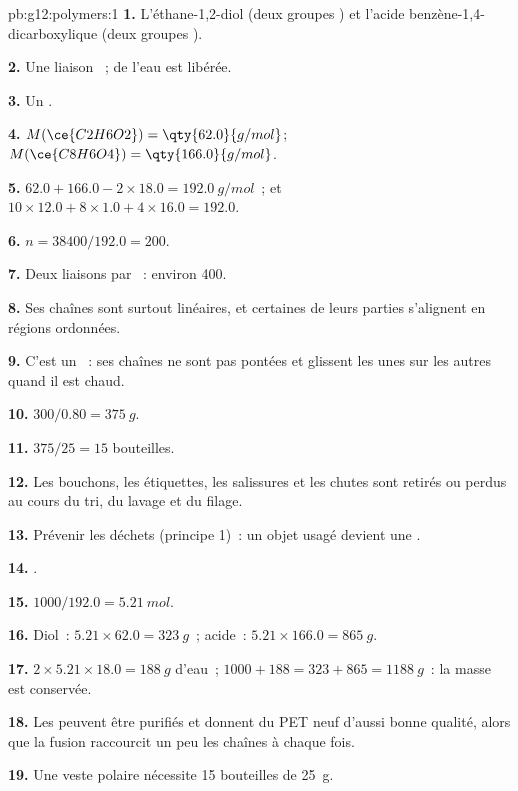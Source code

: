 \begin{solution}{pb:g12:polymers:1}
\textbf{1.} L'éthane-1,2-diol (deux groupes ) et l'acide
benzène-1,4-dicarboxylique (deux groupes ).

\textbf{2.} Une liaison ~; de l'eau est libérée.

\textbf{3.} Un .

\textbf{4.} $M(\ce{C2H6O2}) = \qty{62.0}{g/mol}$; $M(\ce{C8H6O4}) =
\qty{166.0}{g/mol}$.

\textbf{5.} $62.0 + 166.0 - 2 \times 18.0 = \qty{192.0}{g/mol}$~; et
$10 \times 12.0 + 8 \times 1.0 + 4 \times 16.0 = 192.0$.

\textbf{6.} $n = 38400/192.0 = 200$.

\textbf{7.} Deux liaisons  par ~: environ 400.

\textbf{8.} Ses chaînes sont surtout linéaires, et certaines de leurs
parties s'alignent en régions ordonnées.

\textbf{9.} C'est un ~: ses chaînes ne sont pas pontées
et glissent les unes sur les autres quand il est chaud.

\textbf{10.} $300/0.80 = \qty{375}{g}$.

\textbf{11.} $375/25 = 15$ bouteilles.

\textbf{12.} Les bouchons, les étiquettes, les salissures et les chutes
sont retirés ou perdus au cours du tri, du lavage et du filage.

\textbf{13.} Prévenir les déchets (principe 1)~: un objet usagé devient
une .

\textbf{14.} .

\textbf{15.} $1000/192.0 = \qty{5.21}{mol}$.

\textbf{16.} Diol~: $5.21 \times 62.0 = \qty{323}{g}$~; acide~:
$5.21 \times 166.0 = \qty{865}{g}$.

\textbf{17.} $2 \times 5.21 \times 18.0 = \qty{188}{g}$ d'eau~;
$1000 + 188 = 323 + 865 = \qty{1188}{g}$~: la masse est conservée.

\textbf{18.} Les  peuvent être purifiés et donnent du PET neuf
d'aussi bonne qualité, alors que la fusion raccourcit un peu les chaînes
à chaque fois.

\textbf{19.} Une veste polaire nécessite 15 bouteilles de \qty{25}{g}.
\end{solution}
